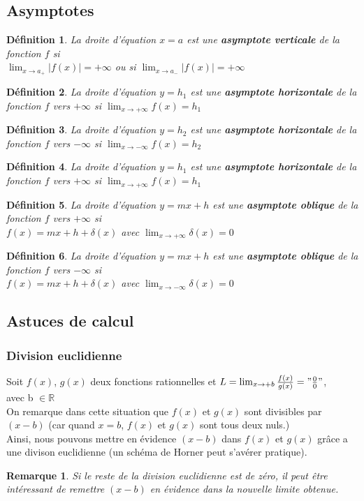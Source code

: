 \documentclass[12pt, a4paper]{book}
\newtheorem*{definition}{Définition}
\newtheorem*{remarque}{Remarque}
\begin{document}
\subsection{Asymptotes}
\begin{definition}
    La droite d'équation $x=a$ est une \textbf{asymptote verticale} de la fonction $f$ si\\
    $\lim_{x \to a_+} \lvert f(x) \rvert = + \infty$ ou si  $\lim_{x \to a_-} \lvert f(x) \rvert= +\infty$
\end{definition}
\begin{definition}
    La droite d'équation $y=h_1$ est une \textbf{asymptote horizontale} de la fonction $f$ vers $+\infty$ si $\lim_{x \to + \infty}  f(x)  = h_1$
\end{definition}
\begin{definition}
    La droite d'équation $y=h_2$ est une \textbf{asymptote horizontale} de la fonction $f$ vers $-\infty$ si $\lim_{x \to - \infty}  f(x)  = h_2$
\end{definition}
\begin{definition}
    La droite d'équation $y=h_1$ est une \textbf{asymptote horizontale} de la fonction $f$ vers $+\infty$ si $\lim_{x \to + \infty}  f(x)  = h_1$
\end{definition}
\begin{definition}
    La droite d'équation $y=mx+h$ est une \textbf{asymptote oblique} de la fonction $f$ vers $+\infty$ si \\$f(x) = mx + h + \delta(x)$ avec $\lim_{x \to  +\infty}\delta(x)  = 0$
\end{definition}
\begin{definition}
    La droite d'équation $y=mx+h$ est une \textbf{asymptote oblique} de la fonction $f$ vers $-\infty$ si \\$f(x) = mx + h + \delta(x)$ avec $\lim_{x \to  -\infty}\delta(x)  = 0$
\end{definition}
\subsection{Astuces de calcul}
\subsubsection{Division euclidienne}
Soit $f(x)$, $g(x)$ deux fonctions rationnelles et $L =\lim_{x \to + b}  \frac{f(x)}{g(x)}  = "\frac{0}{0}"$,\\
avec b $\in \mathbb{R}$\\
On remarque dans cette situation que $f(x)$ et $g(x)$ sont divisibles par $(x-b)$ (car quand $x = b$, $f(x)$ et $g(x)$ sont tous deux nuls.)\\
Ainsi, nous pouvons mettre en évidence $(x-b)$ dans $f(x)$ et $g(x)$ grâce a une divison euclidienne (un schéma de Horner peut s'avérer pratique).
\begin{remarque}
    Si le reste de la division euclidienne est de zéro, il peut être intéressant de remettre $(x-b)$ en évidence dans la nouvelle limite obtenue.
\end{remarque}
\end{document}
